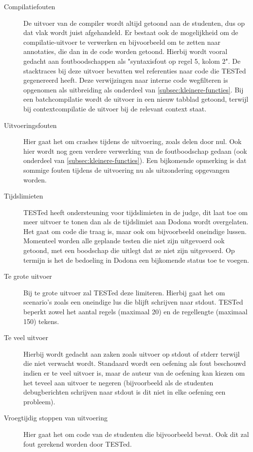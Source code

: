 \begin{description}
    \item[Compilatiefouten] De uitvoer van de compiler wordt altijd getoond aan de studenten, dus op dat vlak wordt juist afgehandeld.
    Er bestaat ook de mogelijkheid om de compilatie-uitvoer te verwerken en bijvoorbeeld om te zetten naar annotaties, die dan in de code worden getoond.
    Hierbij wordt vooral gedacht aan foutboodschappen als "syntaxisfout op regel 5, kolom 2".
    De stacktraces bij deze uitvoer bevatten wel referenties naar code die TESTed gegenereerd heeft.
    Deze verwijzingen naar interne code wegfilteren is opgenomen als uitbreiding als onderdeel van \cref{subsec:kleinere-functies}.
    Bij een batchcompilatie wordt de uitvoer in een nieuw tabblad getoond, terwijl bij contextcompilatie de uitvoer bij de relevant context staat.
    \item[Uitvoeringsfouten] Hier gaat het om crashes tijdens de uitvoering, zoals delen door nul.
    Ook hier wordt nog geen verdere verwerking van de foutboodschap gedaan (ook onderdeel van \cref{subsec:kleinere-functies}).
    Een bijkomende opmerking is dat sommige fouten tijdens de uitvoering nu als uitzondering opgevangen worden.
    \item[Tijdslimieten] TESTed heeft ondersteuning voor tijdslimieten in de judge, dit laat toe om meer uitvoer te tonen dan als de tijdslimiet aan Dodona wordt overgelaten.
    Het gaat om code die traag is, maar ook om bijvoorbeeld oneindige lussen.
    Momenteel worden alle geplande testen die niet zijn uitgevoerd ook getoond, met een boodschap die uitlegt dat ze niet zijn uitgevoerd.
    Op termijn is het de bedoeling in Dodona een bijkomende status toe te voegen.
    \item[Te grote uitvoer] Bij te grote uitvoer zal TESTed deze limiteren.
    Hierbij gaat het om scenario's zoals een oneindige lus die blijft schrijven naar stdout.
    TESTed beperkt zowel het aantal regels (maximaal 20) en de regellengte (maximaal 150) tekens.
    \item[Te veel uitvoer] Hierbij wordt gedacht aan zaken zoals uitvoer op stdout of stderr terwijl die niet verwacht wordt.
    Standaard wordt een oefening als fout beschouwd indien er te veel uitvoer is, maar de auteur van de oefening kan kiezen om het teveel aan uitvoer te negeren (bijvoorbeeld als de studenten debugberichten schrijven naar stdout is dit niet in elke oefening een probleem).
    \item[Vroegtijdig stoppen van uitvoering] Hier gaat het om code van de studenten die bijvoorbeeld  bevat.
    Ook dit zal fout gerekend worden door TESTed.

\end{description}

